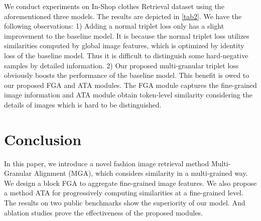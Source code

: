\documentclass[10pt,twocolumn,letterpaper]{article}
\begin{document}
\par We conduct experiments on In-Shop clothes Retrieval dataset using the aforementioned three models. The results are depicted in \cref{tab2}. We have the following observations: 1) Adding a normal triplet loss only has a slight improvement  to the baseline model. It is because the normal triplet loss utilizes similarities computed by global image features, which is optimized by identity loss of the baseline model. Thus it is difficult to distinguish some hard-negative samples by detailed information. 2) Our proposed multi-granular triplet loss obviously boosts the performance of the baseline model. This benefit is owed to our proposed FGA and ATA modules. The FGA module captures the fine-grained image information and ATA module obtain token-level similarity considering the details of images which is hard to be distinguished.





\section{Conclusion}
In this paper, we introduce a novel fashion image retrieval method Multi-Granular Alignment (MGA), which considers similarity in a multi-grained way. We design a block FGA to aggregate fine-grained image features. We also propose a method ATA for progressively computing similarities at a fine-grained level. The results on two public benchmarks show the superiority of our model. And ablation studies prove the effectiveness of the proposed modules. 


{\small


}
\end{document}

